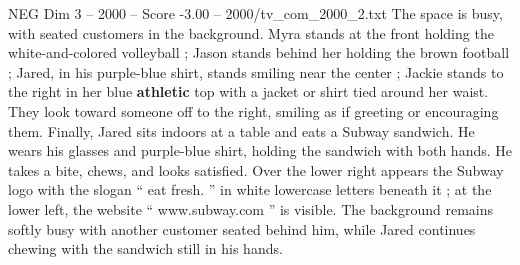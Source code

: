 \begin{textsample}{NEG Dim 3 – 2000 – Score -3.00 – 2000/tv\_com\_2000\_2.txt}
The space is busy, with seated customers in the background.
Myra stands at the front holding the white-and-colored volleyball ; Jason stands behind her holding the brown football ; Jared, in his purple-blue shirt, stands smiling near the center ; Jackie stands to the right in her blue \textbf{athletic} top with a jacket or shirt tied around her waist.
They look toward someone off to the right, smiling as if greeting or encouraging them.
Finally, Jared sits indoors at a table and eats a Subway sandwich.
He wears his glasses and purple-blue shirt, holding the sandwich with both hands.
He takes a bite, chews, and looks satisfied.
Over the lower right appears the Subway logo with the slogan “ eat fresh. ” in white lowercase letters beneath it ; at the lower left, the website “ www.subway.com ” is visible.
The background remains softly busy with another customer seated behind him, while Jared continues chewing with the sandwich still in his hands.

\end{textsample}
